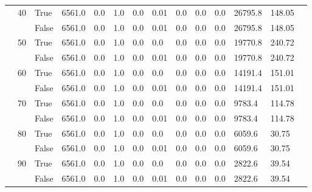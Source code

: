 \begin{landscape}
\begin{small}
\begin{longtable}[c]{@{}lll|ll|ll|ll|ll|lll@{}}
   & 40 & True  & 6561.0          & 0.0            & 1.0           & 0.0           & 0.01          & 0.0           & 0.0           & 0.0           & 26795.8       & 148.05      &  \\
   &    & False & 6561.0          & 0.0            & 1.0           & 0.0           & 0.01          & 0.0           & 0.0           & 0.0           & 26795.8       & 148.05      &  \\
   & 50 & True  & 6561.0          & 0.0            & 1.0           & 0.0           & 0.0           & 0.0           & 0.0           & 0.0           & 19770.8       & 240.72      &  \\
   &    & False & 6561.0          & 0.0            & 1.0           & 0.0           & 0.01          & 0.0           & 0.0           & 0.0           & 19770.8       & 240.72      &  \\
   & 60 & True  & 6561.0          & 0.0            & 1.0           & 0.0           & 0.0           & 0.0           & 0.0           & 0.0           & 14191.4       & 151.01      &  \\
   &    & False & 6561.0          & 0.0            & 1.0           & 0.0           & 0.01          & 0.0           & 0.0           & 0.0           & 14191.4       & 151.01      &  \\
   & 70 & True  & 6561.0          & 0.0            & 1.0           & 0.0           & 0.0           & 0.0           & 0.0           & 0.0           & 9783.4        & 114.78      &  \\
   &    & False & 6561.0          & 0.0            & 1.0           & 0.0           & 0.01          & 0.0           & 0.0           & 0.0           & 9783.4        & 114.78      &  \\
   & 80 & True  & 6561.0          & 0.0            & 1.0           & 0.0           & 0.0           & 0.0           & 0.0           & 0.0           & 6059.6        & 30.75       &  \\
   &    & False & 6561.0          & 0.0            & 1.0           & 0.0           & 0.01          & 0.0           & 0.0           & 0.0           & 6059.6        & 30.75       &  \\
   & 90 & True  & 6561.0          & 0.0            & 1.0           & 0.0           & 0.0           & 0.0           & 0.0           & 0.0           & 2822.6        & 39.54       &  \\
   &    & False & 6561.0          & 0.0            & 1.0           & 0.0           & 0.01          & 0.0           & 0.0           & 0.0           & 2822.6        & 39.54       &  \\

\end{longtable}
\end{small}
\end{landscape}
